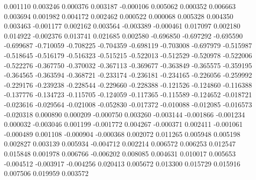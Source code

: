 0.001110
0.003246
0.000376
0.003187
-0.000106
0.005062
0.000352
0.006663
0.003694
0.001982
0.004172
0.002462
0.000522
0.000068
0.005328
0.004350
0.003463
-0.001177
0.002162
0.003564
-0.003389
-0.000461
0.017097
0.002180
0.014922
-0.002376
0.013741
0.021685
0.002580
-0.696850
-0.697292
-0.695590
-0.699687
-0.710059
-0.708225
-0.704359
-0.698119
-0.703008
-0.697979
-0.515987
-0.518645
-0.516179
-0.516323
-0.515215
-0.522013
-0.512529
-0.520978
-0.522006
-0.522276
-0.367750
-0.370032
-0.367113
-0.369677
-0.363849
-0.365575
-0.359195
-0.364565
-0.363594
-0.368721
-0.233174
-0.236181
-0.234165
-0.226056
-0.259992
-0.229176
-0.239238
-0.228544
-0.229660
-0.228388
-0.121526
-0.124860
-0.116388
-0.137776
-0.134723
-0.115705
-0.124059
-0.117365
-0.115589
-0.124652
-0.018721
-0.023616
-0.029564
-0.021008
-0.052830
-0.017372
-0.010088
-0.012085
-0.016573
-0.020318
0.000890
0.000209
-0.000750
0.003260
-0.003144
-0.001866
-0.001234
0.000032
-0.003046
0.001199
-0.001772
0.004267
-0.000371
0.002411
-0.001061
-0.000489
0.001108
-0.000904
-0.000368
0.002072
0.011265
0.005948
0.005198
0.002827
0.003139
0.005934
-0.004712
0.002214
0.006572
0.006253
0.012547
0.015848
0.001978
0.006766
-0.006202
0.008085
0.004631
0.010017
0.005653
-0.004512
-0.003917
-0.004256
0.020413
0.005672
0.013300
0.015729
0.015916
0.007506
0.019959
0.003572
